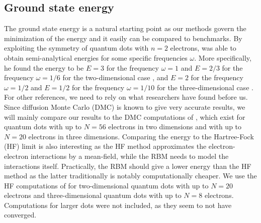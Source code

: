 \subsection{Ground state energy} \label{sec:groundstateenergy}
The ground state energy is a natural starting point as our methods govern the minimization of the energy and it easily can be compared to benchmarks. By exploiting the symmetry of quantum dots with $n=2$ electrons, \citeauthor{taut_two_1993} was able to obtain semi-analytical energies for some specific frequencies $\omega$. More specifically, he found the energy to be $E=3$ for the frequency $\omega=1$ and $E=2/3$ for the frequency $\omega=1/6$ for the two-dimensional case \cite{taut_two_1993}, and $E=2$ for the frequency $\omega=1/2$ and $E=1/2$ for the frequency $\omega=1/10$ for the three-dimensional case \cite{taut_two_1994}. For other references, we need to rely on what researchers have found before us. Since diffusion Monte Carlo (DMC) is known to give very accurate results, we will mainly compare our results to the DMC computations of \citet{hogberget_quantum_2013}, which exist for quantum dots with up to $N=56$ electrons in two dimensions and with up to $N=20$ electrons in three dimensions. Comparing the energy to the Hartree-Fock (HF) limit is also interesting as the HF method approximates the electron-electron interactions by a mean-field, while the RBM needs to model the interactions itself. Practically, the RBM should give a lower energy than the HF method as the latter traditionally is notably computationally cheaper. We use the HF computations of \citet{mariadason_quantum_2018} for two-dimensional quantum dots with up to $N=20$ electrons and three-dimensional quantum dots with up to $N=8$ electrons. Computations for larger dots were not included, as they seem to not have converged.

